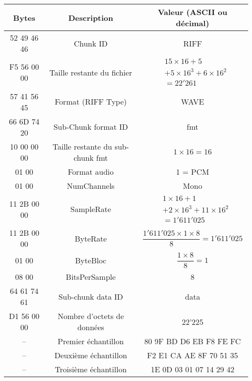 \documentclass[a4paper, 12pt]{article}
\begin{document}
  \begin{tabular}{|c|c|c|}
    \hline
    Bytes & Description & Valeur (ASCII ou décimal) \\
    \hline
    52 49 46 46 & Chunk ID & RIFF \\
    \hline
    F5 56 00 00 & Taille restante du fichier & $\begin{aligned} 
    & 15 \times 16 + 5 \\
    & + 5 \times 16^{3} + 6 \times 16^{2} \\
    &= 22'261 
    \end{aligned}$ \\
    \hline
    57 41 56 45 & Format (RIFF Type) & WAVE \\
    \hline
    66 6D 74 20 & Sub-Chunk format ID & fmt \\
    \hline
    10 00 00 00 & Taille restante du sub-chunk fmt & $1 \times 16 = 16$ \\
    \hline
    01 00 & Format audio & 1 = PCM \\
    \hline
    01 00 & NumChannels & Mono \\
    \hline
    11 2B 00 00 & SampleRate & $\begin{aligned} 
    & 1 \times 16 + 1 \\
    & + 2 \times 16^{3} + 11 \times 16^{2} \\
    &= 1'611'025 
    \end{aligned}$ \\
    \hline
    11 2B 00 00 & ByteRate & $\dfrac{1'611'025 \times 1 \times 8}{8} = 1'611'025$ \\
    \hline
    01 00 & ByteBloc & $\dfrac{1 \times 8}{8} = 1$ \\
    \hline
    08 00 & BitsPerSample & 8 \\
    \hline
    64 61 74 61 & Sub-chunk data ID & data \\
    \hline
    D1 56 00 00 & Nombre d'octets de données & 22'225 \\
    \hline
    -- & Premier échantillon & 80 9F BD D6 EB F8 FE FC \\
    \hline
    -- & Deuxième échantillon & F2 E1 CA AE 8F 70 51 35 \\
    \hline
    -- & Troisième échantillon & 1E 0D 03 01 07 14 29 42 \\
    \hline
  \end{tabular}
\end{document}
